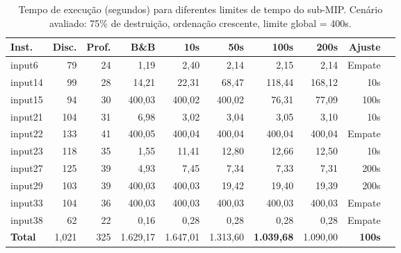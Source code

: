\begin{table}[htbp]
\centering
\caption{Tempo de execução (segundos) para diferentes limites de tempo do sub-MIP. Cenário avaliado: 75\% de destruição, ordenação crescente, limite global = 400s.}
\label{tab:lns_time_tempo}
\small
\begin{tabular}{@{}lrrrrrrrrr@{}}
\toprule
\textbf{Inst.} & \textbf{Disc.} & \textbf{Prof.} & \textbf{B\&B} & \textbf{10s} & \textbf{50s} & \textbf{100s} & \textbf{200s} & \textbf{Ajuste} \\
\midrule
input6  & 79  & 24 & 1,19   & 2,40   & 2,14   & 2,15   & 2,14   & Empate \\
input14 & 99  & 28 & 14,21  & 22,31  & 68,47  & 118,44 & 168,12 & 10s \\
input15 & 94  & 30 & 400,03 & 400,02 & 400,02 & 76,31 & 77,09 & 100s \\
input21 & 104 & 31 & 6,98   & 3,02   & 3,04   & 3,05   & 3,10   & 10s \\
input22 & 133 & 41 & 400,05 & 400,04 & 400,04 & 400,04 & 400,04 & Empate \\
input23 & 118 & 35 & 1,55   & 11,41  & 12,80  & 12,66  & 12,50  & 10s \\
input27 & 125 & 39 & 4,93   & 7,45   & 7,34   & 7,33   & 7,31   & 200s \\
input29 & 103 & 39 & 400,03 & 400,03 & 19,42  & 19,40  & 19,39  & 200s \\
input33 & 104 & 36 & 400,03 & 400,03 & 400,03 & 400,03 & 400,03 & Empate \\
input38 & 62  & 22 & 0,16   & 0,28   & 0,28   & 0,28   & 0,28   & Empate \\
\midrule
\textbf{Total} & 1,021 & 325 & 1.629,17 & 1.647,01 & 1.313,60 & \textbf{1.039,68} & 1.090,00 & \textbf{100s} \\
\bottomrule
\end{tabular}
\end{table}
